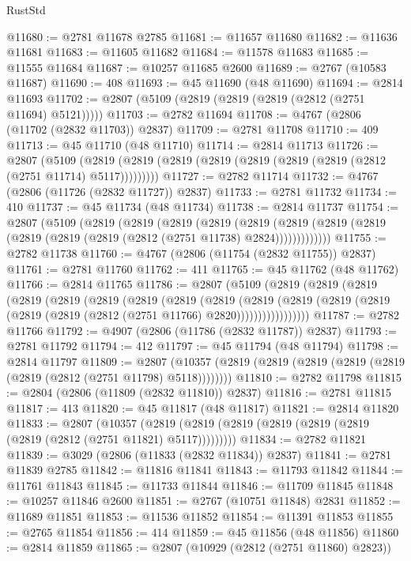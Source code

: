 \begin{lexlean}{RustStd}
\begin{coremodule}
@11680 := @2781 @11678 @2785
@11681 := @11657 @11680
@11682 := @11636 @11681
@11683 := @11605 @11682
@11684 := @11578 @11683
@11685 := @11555 @11684
@11687 := @10257 @11685 @2600
@11689 := @2767 (@10583 @11687)
@11690 := 408
@11693 := @45 @11690 (@48 @11690)
@11694 := @2814 @11693
@11702 := @2807 (@5109 (@2819 (@2819 (@2819 (@2812 (@2751 @11694) @5121)))))
@11703 := @2782 @11694
@11708 := @4767 (@2806 (@11702 (@2832 @11703)) @2837)
@11709 := @2781 @11708
@11710 := 409
@11713 := @45 @11710 (@48 @11710)
@11714 := @2814 @11713
@11726 := @2807
    (@5109 (@2819 (@2819 (@2819 (@2819 (@2819 (@2819 (@2819 (@2812 (@2751 @11714) @5117)))))))))
@11727 := @2782 @11714
@11732 := @4767 (@2806 (@11726 (@2832 @11727)) @2837)
@11733 := @2781 @11732
@11734 := 410
@11737 := @45 @11734 (@48 @11734)
@11738 := @2814 @11737
@11754 := @2807
    (@5109
      (@2819
        (@2819
          (@2819
            (@2819
              (@2819
                (@2819 (@2819 (@2819 (@2819 (@2819 (@2819 (@2812 (@2751 @11738) @2824)))))))))))))
@11755 := @2782 @11738
@11760 := @4767 (@2806 (@11754 (@2832 @11755)) @2837)
@11761 := @2781 @11760
@11762 := 411
@11765 := @45 @11762 (@48 @11762)
@11766 := @2814 @11765
@11786 := @2807
    (@5109
      (@2819
        (@2819
          (@2819
            (@2819
              (@2819
                (@2819
                  (@2819
                    (@2819
                      (@2819
                        (@2819
                          (@2819
                            (@2819 (@2819 (@2819 (@2819 (@2812 (@2751 @11766) @2820)))))))))))))))))
@11787 := @2782 @11766
@11792 := @4907 (@2806 (@11786 (@2832 @11787)) @2837)
@11793 := @2781 @11792
@11794 := 412
@11797 := @45 @11794 (@48 @11794)
@11798 := @2814 @11797
@11809 := @2807
    (@10357 (@2819 (@2819 (@2819 (@2819 (@2819 (@2819 (@2812 (@2751 @11798) @5118))))))))
@11810 := @2782 @11798
@11815 := @2804 (@2806 (@11809 (@2832 @11810)) @2837)
@11816 := @2781 @11815
@11817 := 413
@11820 := @45 @11817 (@48 @11817)
@11821 := @2814 @11820
@11833 := @2807
    (@10357 (@2819 (@2819 (@2819 (@2819 (@2819 (@2819 (@2819 (@2812 (@2751 @11821) @5117)))))))))
@11834 := @2782 @11821
@11839 := @3029 (@2806 (@11833 (@2832 @11834)) @2837)
@11841 := @2781 @11839 @2785
@11842 := @11816 @11841
@11843 := @11793 @11842
@11844 := @11761 @11843
@11845 := @11733 @11844
@11846 := @11709 @11845
@11848 := @10257 @11846 @2600
@11851 := @2767 (@10751 @11848) @2831
@11852 := @11689 @11851
@11853 := @11536 @11852
@11854 := @11391 @11853
@11855 := @2765 @11854
@11856 := 414
@11859 := @45 @11856 (@48 @11856)
@11860 := @2814 @11859
@11865 := @2807 (@10929 (@2812 (@2751 @11860) @2823))

\end{coremodule}
\end{lexlean}
